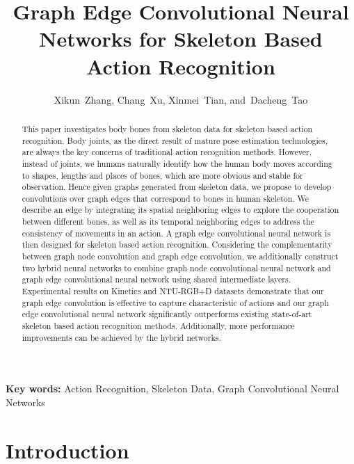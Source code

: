\documentclass[a4paper,11pt]{article}
\begin{document}
\author{Xikun~Zhang, Chang~Xu, Xinmei~Tian, and~Dacheng~Tao}
\title{Graph Edge Convolutional Neural Networks for Skeleton Based Action Recognition}
\maketitle






\begin{abstract}
This paper investigates body bones from skeleton data for skeleton based action recognition. Body joints, as the direct result of mature pose estimation technologies, are always the key concerns of traditional action recognition methods. However, instead of joints, we humans naturally identify how the human body moves according to shapes, lengths and places of bones, which are more obvious and stable for observation. 
Hence given graphs generated from skeleton data, we propose to develop convolutions over graph edges that correspond to bones in human skeleton. We describe an edge by integrating its spatial neighboring edges to explore the cooperation between different bones, as well as its temporal neighboring edges to address the consistency of movements in an action. A graph edge convolutional neural network is then designed for skeleton based action recognition. Considering the complementarity between graph node convolution and graph edge convolution, we additionally construct two hybrid neural networks to combine graph node convolutional neural network and graph edge convolutional neural network using shared intermediate layers. Experimental results on Kinetics and NTU-RGB+D datasets demonstrate that our graph edge convolution is effective to capture characteristic of actions and our graph edge convolutional neural network significantly outperforms existing state-of-art skeleton based action recognition methods. Additionally, more performance improvements can be achieved by the hybrid networks. 
\end{abstract}

{\bf Key words:} Action Recognition, Skeleton Data, Graph Convolutional Neural Networks






\section{Introduction}
\end{document}

